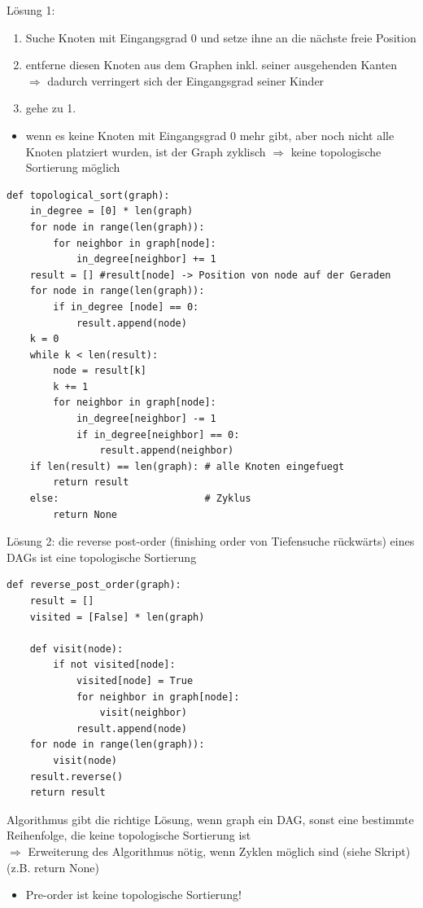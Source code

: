 \documentclass[11pt, fleqn]{scrreprt}
\begin{document}
    Lösung 1:
    \begin{enumerate}
        \item Suche Knoten mit Eingangsgrad 0 und setze ihne an die nächste freie Position
        \item entferne diesen Knoten aus dem Graphen inkl. seiner ausgehenden Kanten\\
        $\Rightarrow$ dadurch verringert sich der Eingangsgrad seiner Kinder
        \item gehe zu 1.
    \end{enumerate}
    \begin{itemize}[label={}]
        \item wenn es keine Knoten mit Eingangsgrad 0 mehr gibt, aber noch nicht alle Knoten platziert wurden, ist der Graph zyklisch $\Rightarrow$ keine topologische Sortierung möglich
    \end{itemize}


    \begin{verbatim}
def topological_sort(graph):
    in_degree = [0] * len(graph)
    for node in range(len(graph)):
        for neighbor in graph[node]:
            in_degree[neighbor] += 1
    result = [] #result[node] -> Position von node auf der Geraden
    for node in range(len(graph)):
        if in_degree [node] == 0:
            result.append(node)
    k = 0
    while k < len(result):
        node = result[k]
        k += 1
        for neighbor in graph[node]:
            in_degree[neighbor] -= 1
            if in_degree[neighbor] == 0:
                result.append(neighbor)
    if len(result) == len(graph): # alle Knoten eingefuegt
        return result
    else:                         # Zyklus
        return None
    \end{verbatim}


    Lösung 2: die reverse post-order (finishing order von Tiefensuche rückwärts) eines DAGs ist eine topologische Sortierung

    \begin{verbatim}
def reverse_post_order(graph):
    result = []
    visited = [False] * len(graph)

    def visit(node):
        if not visited[node]:
            visited[node] = True
            for neighbor in graph[node]:
                visit(neighbor)
            result.append(node)
    for node in range(len(graph)):
        visit(node)
    result.reverse()
    return result
    \end{verbatim}

    Algorithmus gibt die richtige Lösung, wenn graph ein DAG, sonst eine bestimmte Reihenfolge, die keine topologische Sortierung ist\\
    $\Rightarrow$ Erweiterung des Algorithmus nötig, wenn Zyklen möglich sind (siehe Skript) (z.B. return None)
    \begin{itemize}
        \item Pre-order ist keine topologische Sortierung!
    \end{itemize}
\end{document}
